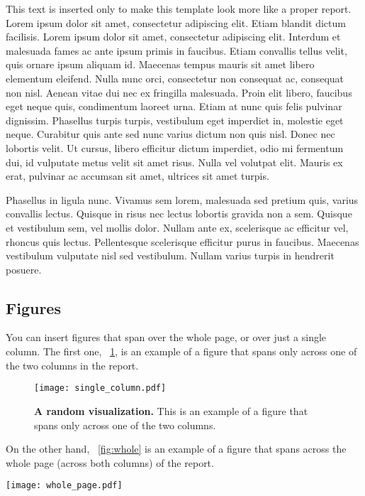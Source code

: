 \documentclass[fleqn,moreauthors,10pt]{ds_report}
\begin{document}
This text is inserted only to make this template look more like a proper report. Lorem ipsum dolor sit amet, consectetur adipiscing elit. Etiam blandit dictum facilisis. Lorem ipsum dolor sit amet, consectetur adipiscing elit. Interdum et malesuada fames ac ante ipsum primis in faucibus. Etiam convallis tellus velit, quis ornare ipsum aliquam id. Maecenas tempus mauris sit amet libero elementum eleifend. Nulla nunc orci, consectetur non consequat ac, consequat non nisl. Aenean vitae dui nec ex fringilla malesuada. Proin elit libero, faucibus eget neque quis, condimentum laoreet urna. Etiam at nunc quis felis pulvinar dignissim. Phasellus turpis turpis, vestibulum eget imperdiet in, molestie eget neque. Curabitur quis ante sed nunc varius dictum non quis nisl. Donec nec lobortis velit. Ut cursus, libero efficitur dictum imperdiet, odio mi fermentum dui, id vulputate metus velit sit amet risus. Nulla vel volutpat elit. Mauris ex erat, pulvinar ac accumsan sit amet, ultrices sit amet turpis.

Phasellus in ligula nunc. Vivamus sem lorem, malesuada sed pretium quis, varius convallis lectus. Quisque in risus nec lectus lobortis gravida non a sem. Quisque et vestibulum sem, vel mollis dolor. Nullam ante ex, scelerisque ac efficitur vel, rhoncus quis lectus. Pellentesque scelerisque efficitur purus in faucibus. Maecenas vestibulum vulputate nisl sed vestibulum. Nullam varius turpis in hendrerit posuere.


\subsection*{Figures}

You can insert figures that span over the whole page, or over just a single column. The first one, \figurename~\ref{fig:column}, is an example of a figure that spans only across one of the two columns in the report.

\begin{figure}[ht]\centering
	\texttt{[image: single\_column.pdf]}
	\caption{\textbf{A random visualization.} This is an example of a figure that spans only across one of the two columns.}
	\label{fig:column}
\end{figure}

On the other hand, \figurename~\ref{fig:whole} is an example of a figure that spans across the whole page (across both columns) of the report.

\begin{figure*}[ht]\centering 
	\texttt{[image: whole\_page.pdf]}
	\caption{\textbf{Visualization of a Bayesian hierarchical model.} This is an example of a figure that spans the whole width of the report.}
	\label{fig:whole}
\end{figure*}
\end{document}
